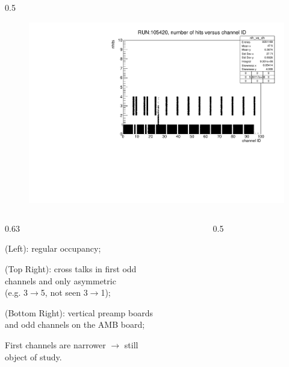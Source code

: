\documentclass{beamer}
\begin{document}
\begin{frame}
\begin{columns}
\begin{column}{0.5\framewidth}
\begin{figure}[!h]
\includegraphics[width=0.95\columnwidth]{figures/pdf/run105420_nh_vs_ch.pdf}
     \label{fig:normalhits}
\end{figure}
\end{column}
\end{columns}
\vspace{-1.5mm}
    \begin{columns}
    \begin{column}{0.63\framewidth}
        \setlength{\leftmargini}{1.1em}
      \begin{itemize}
 {\footnotesize
 \item (Left): regular occupancy;
 \vspace{-0.3mm}
 \item (Top Right): cross talks in first odd \\ channels and only asymmetric \\ (e.g. 3$\rightarrow$5, not seen 3$\rightarrow$1); 
 \vspace{-0.3mm}
 \item (Bottom Right): vertical preamp boards \\ and odd channels on the AMB board;
 \vspace{-0.3mm}
 \item First channels are narrower $\rightarrow$ still \\ object of study.}
\end{itemize}
\end{column}
\begin{column}{0.5\framewidth}
         \begin{figure}[!h]
      \centering
      \hspace*{-2em}

\end{figure}
\end{column}
\end{columns}
\end{frame}
\end{document}
